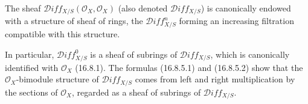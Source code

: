 \begin{corollary}[16.8.10]
\label{IV.16.8.10}
The sheaf $\mathscr{D}\!iff_{X/S}(\mathcal{O}_X,\mathcal{O}_X)$ (also denoted
$\mathscr{D}\!iff_{X/S}$) is canonically endowed with a structure of sheaf
of rings, the $\mathscr{D}\!iff_{X/S}^n$ forming an increasing filtration
compatible with this structure.
\end{corollary}

In particular, $\mathscr{D}\!iff_{X/S}^0$ is a sheaf of subrings of
$\mathscr{D}\!iff_{X/S}$, which is canonically identified with $\mathcal{O}_X$
(16.8.1). The formulas (16.8.5.1) and (16.8.5.2) show that the
$\mathcal{O}_X$-bimodule structure of $\mathscr{D}\!iff_{X/S}$ comes from
left and right multiplication by the sections of $\mathcal{O}_X$,
regarded as a sheaf of subrings of $\mathscr{D}\!iff_{X/S}$.

